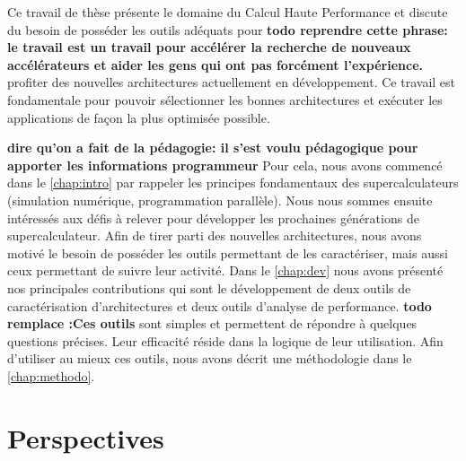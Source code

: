     
    Ce travail de thèse présente le domaine du Calcul Haute Performance et discute du besoin de posséder les outils adéquats pour \textbf{todo reprendre cette phrase: le travail est un travail pour accélérer la recherche de nouveaux accélérateurs et aider les gens qui ont pas forcément l'expérience.} profiter des nouvelles architectures actuellement en développement. Ce travail est fondamentale pour pouvoir sélectionner les bonnes architectures et exécuter les applications de façon la plus optimisée possible.
    
    \textbf{dire qu'on a fait de la pédagogie: il s'est voulu pédagogique pour apporter les informations programmeur}
    Pour cela, nous avons commencé dans le \autoref{chap:intro} par rappeler les principes fondamentaux des supercalculateurs (simulation numérique, programmation parallèle). Nous nous sommes ensuite intéressés aux défis à relever pour développer les prochaines générations de supercalculateur. Afin de tirer parti des nouvelles architectures, nous avons motivé le besoin de posséder les outils permettant de les caractériser, mais aussi ceux permettant de suivre leur activité. Dans le \autoref{chap:dev} nous avons présenté nos principales contributions qui sont le développement de deux outils de caractérisation d'architectures et deux outils d'analyse de performance. \textbf{todo remplace :Ces outils} sont simples et permettent de répondre à quelques questions précises. Leur efficacité réside dans la logique de leur utilisation. Afin d'utiliser au mieux ces outils, nous avons décrit une méthodologie dans le \autoref{chap:methodo}.
        
     
\section*{Perspectives}
    
